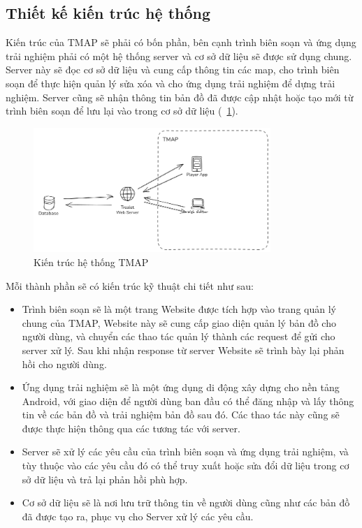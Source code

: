 \subsection{Thiết kế kiến trúc hệ thống}
Kiến trúc của TMAP sẽ phải có bốn phần, bên cạnh trình biên soạn và ứng
dụng trải nghiệm phải có một hệ thống server và cơ sở dữ liệu sẽ được sử dụng
chung. Server này sẽ đọc cơ sở dữ liệu và cung cấp thông tin các map, cho trình
biên soạn để thực hiện quản lý sửa xóa và cho ứng dụng trải nghiệm để dựng trải
nghiệm. Server cũng sẽ nhận thông tin bản đồ đã được cập nhật hoặc tạo mới từ
trình biên soạn để lưu lại vào trong cơ sở dữ liệu (\figurename~\ref{fig:tmap_design}).

\begin{figure}[h]
    \centering
    \includegraphics[width=0.8\textwidth]{figures/tmap_design.png}
    \caption{Kiến trúc hệ thống TMAP}
    \label{fig:tmap_design}
\end{figure}

Mỗi thành phần sẽ có kiến trúc kỹ thuật chi tiết như sau:
\begin{itemize}
\item Trình biên soạn sẽ là một trang Website được tích hợp vào trang quản lý
chung của TMAP, Website này sẽ cung cấp giao diện quản lý bản đồ cho
người dùng, và chuyển các thao tác quản lý thành các request để gửi cho
server xử lý. Sau khi nhận response từ server Website sẽ trình bày lại
phản hồi cho người dùng.
\item Ứng dụng trải nghiệm sẽ là một ứng dụng di động xây dựng cho nền tảng
Android, với giao diện để người dùng ban đầu có thể đăng nhập và lấy
thông tin về các bản đồ và trải nghiệm bản đồ sau đó. Các thao tác này
cũng sẽ được thực hiện thông qua các tương tác với server.
\item Server sẽ xử lý các yêu cầu của trình biên soạn và ứng dụng trải nghiệm,
và tùy thuộc vào các yêu cầu đó có thể truy xuất hoặc sửa đổi dữ liệu
trong cơ sở dữ liệu và trả lại phản hồi phù hợp.
\item Cơ sở dữ liệu sẽ là nơi lưu trữ thông tin về người dùng cũng như các bản
đồ đã được tạo ra, phục vụ cho Server xử lý các yêu cầu.
\end{itemize}

